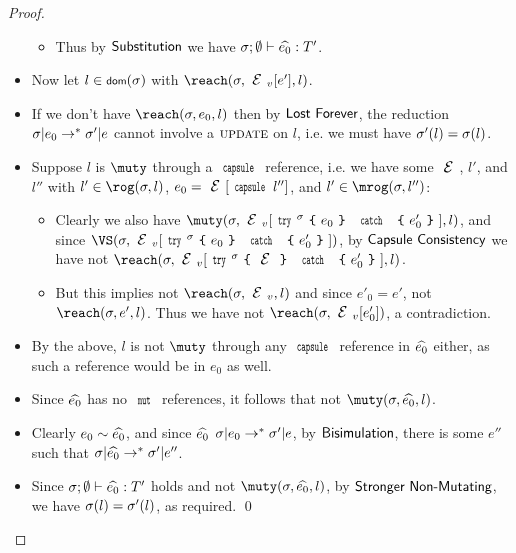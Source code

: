\begin{proof}
\begin{itemize}
\begin{itemize}
			\item Thus by $\textsf{Substitution}$ we have $\tyr{\demut{e_0}}{T'}$.
		\end{itemize}
		\item Now let $l\in\dom(\s)$ with $\reach(\s,\EV[e'],l)$.
		\item If we don't have $\reach(\s,e_0,l)$ then by $\textsf{Lost Forever}$,
		the reduction $\sigma|e_0\rightarrow^*\sigma'|e$ cannot involve a $\textsc{update}$
		on $l$, i.e. we must have $\sigma'(l) = \sigma(l)$.
		\item Suppose $l$ is $\muty$ through a $\Kw{capsule}$ reference, i.e. we have
		some $\E$, $l'$, and $l''$ with $l'\in\rog(\s,l)$, $e_0 = \E[\Kw{capsule}\,l'']$,
		and $l'\in\mrog(\s,l'')$:
		\begin{itemize}
			\item Clearly we also have $\muty(\s,\EV[\trys{\s}{e_0}{e'_0}],l)$,
			and since $\VS(\s,\EV[\trys{\s}{e_0}{e'_0}])$, by $\textsf{Capsule Consistency}$
			we have not $\reach(\s,\EV[\trys{\s}{\E}{e'_0}],l)$.
			\item But this implies not $\reach(\s,\EV,l)$ and since $e'_0 = e'$,
			not $\reach(\s,e',l)$. Thus we have not $\reach(\s,\EV[e'_0])$,
			a contradiction.
		\end{itemize}
		\item By the above, $l$ is not $\muty$ through any $\Kw{capsule}$ reference
		in $\widehat{e_0}$ either, as such a reference would be in $e_0$
		as well.
		\item Since $\widehat{e_0}$ has no $\Kw{mut}$ references, it follows that
		not $\muty(\s,\demut{e_0},l)$.
		\item Clearly $e_0\sim\widehat{e_0}$, and since $\widehat{e_0}$ $\sigma|e_0\rightarrow^*\sigma'|e$,
		by $\textsf{Bisimulation}$, there is some $e''$ such that $\sigma|\widehat{e_0}\rightarrow^*\sigma'|e''$.
		\item Since $\tyr{\demut{e_0}}{T'}$ holds and not $\muty(\s,\demut{e_0},l)$,
		by $\textsf{Stronger Non-Mutating}$, we have $\sigma(l) = \sigma'(l)$, as
		required.
	\qed\end{itemize}
\end{proof}
